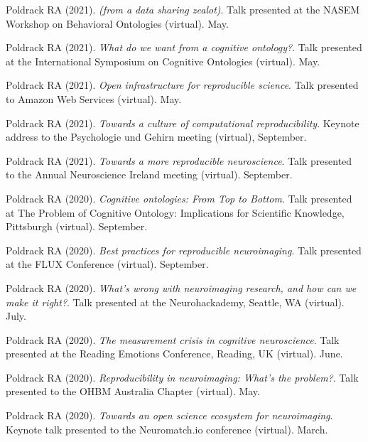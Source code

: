 \documentclass[10pt, letterpaper]{article}
\begin{document}
Poldrack RA (2021). \emph{(from a data sharing zealot)}. Talk presented at the NASEM Workshop on Behavioral Ontologies (virtual). May. \vspace{2mm}

Poldrack RA (2021). \emph{What do we want from a cognitive ontology?}. Talk presented at the International Symposium on Cognitive Ontologies (virtual).  May. \vspace{2mm}

Poldrack RA (2021). \emph{Open infrastructure for reproducible science}. Talk presented to Amazon Web Services (virtual). May. \vspace{2mm}

Poldrack RA (2021). \emph{Towards a culture of computational reproducibility}. Keynote address to the Psychologie und Gehirn meeting (virtual), September. \vspace{2mm}

Poldrack RA (2021). \emph{Towards a more reproducible neuroscience}. Talk presented to the Annual Neuroscience Ireland meeting (virtual). September. \vspace{2mm}

Poldrack RA (2020). \emph{Cognitive ontologies: From Top to Bottom}. Talk presented at The Problem of Cognitive Ontology: Implications for Scientific Knowledge, Pittsburgh (virtual). September. \vspace{2mm}

Poldrack RA (2020). \emph{Best practices for reproducible neuroimaging}. Talk presented at the FLUX Conference (virtual). September. \vspace{2mm}

Poldrack RA (2020). \emph{What's wrong with neuroimaging research, and how can we make it right?}. Talk presented at the Neurohackademy, Seattle, WA (virtual). July. \vspace{2mm}

Poldrack RA (2020). \emph{The measurement crisis in cognitive neuroscience}. Talk presented at the Reading Emotions Conference, Reading, UK (virtual). June. \vspace{2mm}

Poldrack RA (2020). \emph{Reproducibility in neuroimaging: What's the problem?}. Talk presented to the OHBM Australia Chapter (virtual).  May. \vspace{2mm}

Poldrack RA (2020). \emph{Towards an open science ecosystem for neuroimaging}. Keynote talk presented to the Neuromatch.io conference (virtual).  March. \vspace{2mm}
\end{document}
